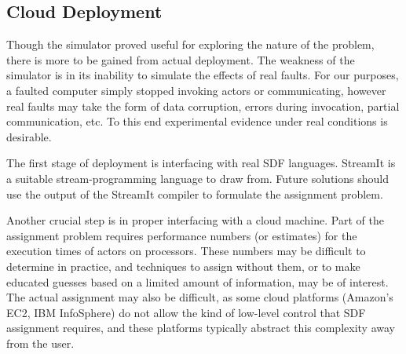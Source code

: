 \subsection{Cloud Deployment}

Though the simulator proved useful for exploring the nature of the problem, there is more to be gained from actual deployment.
The weakness of the simulator is in its inability to simulate the effects of real faults.
For our purposes, a faulted computer simply stopped invoking actors or communicating, however real faults may take the form of data corruption, errors during invocation, partial communication, etc.
To this end experimental evidence under real conditions is desirable.

The first stage of deployment is interfacing with real SDF languages.
StreamIt \cite{thies01, thies02, thies10, mal08} is a suitable stream-programming language to draw from.
Future solutions should use the output of the StreamIt compiler to formulate the assignment problem.

Another crucial step is in proper interfacing with a cloud machine.
Part of the assignment problem requires performance numbers (or estimates) for the execution times of actors on processors.
These numbers may be difficult to determine in practice, and techniques to assign without them, or to make educated guesses based on a limited amount of information, may be of interest.
The actual assignment may also be difficult, as some cloud platforms (Amazon's EC2, IBM InfoSphere) do not allow the kind of low-level control that SDF assignment requires, and these platforms typically abstract this complexity away from the user.
